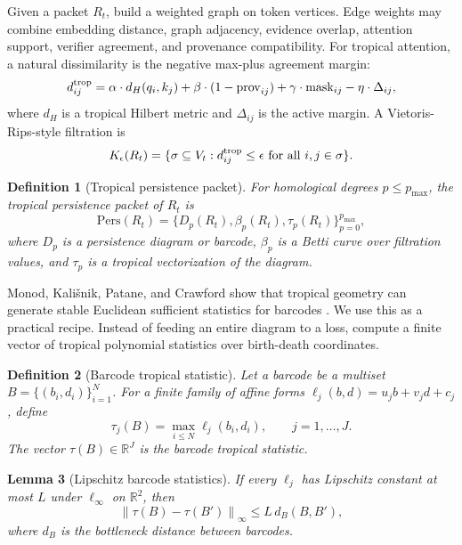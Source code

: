 \documentclass[11pt]{article}
\newtheorem{definition}{Definition}[section]
\newtheorem{lemma}[definition]{Lemma}
\newcommand{\R}{\mathbb{R}}
\newcommand{\norm}[1]{\left\lVert #1\right\rVert}
\begin{document}
Given a packet \(R_t\), build a weighted graph on token vertices.  Edge weights may combine embedding distance, graph adjacency, evidence overlap, attention support, verifier agreement, and provenance compatibility.  For tropical attention, a natural dissimilarity is the negative max-plus agreement margin:
\begin{equation}
d_{ij}^{\rm trop}=\alpha\cdot d_H(q_i,k_j)+\beta\cdot (1-\mathrm{prov}_{ij})+\gamma\cdot \mathrm{mask}_{ij}-\eta\cdot \Delta_{ij},
\end{equation}
where \(d_H\) is a tropical Hilbert metric and \(\Delta_{ij}\) is the active margin.  A Vietoris-Rips-style filtration is
\begin{equation}
K_\epsilon(R_t)=\{\sigma\subseteq V_t: d_{ij}^{\rm trop}\le \epsilon\text{ for all }i,j\in\sigma\}.
\end{equation}

\begin{definition}[Tropical persistence packet]
For homological degrees \(p\le p_{\max}\), the tropical persistence packet of \(R_t\) is
\begin{equation}
\mathrm{Pers}(R_t)=\{D_p(R_t),\beta_p(R_t),\tau_p(R_t)\}_{p=0}^{p_{\max}},
\end{equation}
where \(D_p\) is a persistence diagram or barcode, \(\beta_p\) is a Betti curve over filtration values, and \(\tau_p\) is a tropical vectorization of the diagram.
\end{definition}

Monod, Kališnik, Patane, and Crawford show that tropical geometry can generate stable Euclidean sufficient statistics for barcodes \cite{monod2019tropical}.  We use this as a practical recipe.  Instead of feeding an entire diagram to a loss, compute a finite vector of tropical polynomial statistics over birth-death coordinates.

\begin{definition}[Barcode tropical statistic]
Let a barcode be a multiset \(B=\{(b_i,d_i)\}_{i=1}^N\).  For a finite family of affine forms \(\ell_j(b,d)=u_jb+v_jd+c_j\), define
\begin{equation}
\tau_j(B)=\max_{i\le N}\ell_j(b_i,d_i),\qquad j=1,\ldots,J.
\end{equation}
The vector \(\tau(B)\in\R^J\) is the barcode tropical statistic.
\end{definition}

\begin{lemma}[Lipschitz barcode statistics]
If every \(\ell_j\) has Lipschitz constant at most \(L\) under \(\ell_\infty\) on \(\R^2\), then
\begin{equation}
\norm{\tau(B)-\tau(B')}_\infty\le L\,d_B(B,B'),
\end{equation}
where \(d_B\) is the bottleneck distance between barcodes.
\end{lemma}
\end{document}
